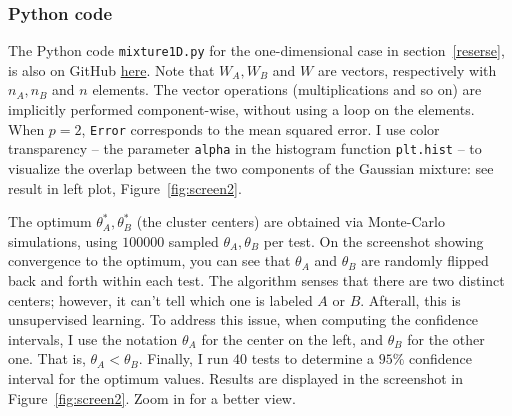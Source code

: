 \documentclass[oneside,10pt]{book}
\begin{document}
\subsubsection{Python code}\label{pyclustrw}

The Python code \texttt{mixture1D.py} for the one-dimensional case in section~\ref{reserse}, is also on GitHub \href{https://github.com/VincentGranville/Machine-Learning/blob/main/Source\%20Code/mixture1D.py}{here}. 
 Note that $W_A, W_B$ and $W$ are vectors, respectively with $n_A,n_B$ and $n$ elements. The vector operations (multiplications and so on) are  implicitly performed component-wise, without using a loop on the elements. When $p=2$, \texttt{Error} corresponds to the mean squared error. I use color transparency -- the parameter \texttt{alpha} in 
 the histogram function \texttt{plt.hist} -- to visualize the overlap between the two components of the Gaussian mixture: see result in left plot,
 Figure~\ref{fig:screen2}. 

The optimum $\theta_A^*,\theta_B^*$ (the cluster centers) are obtained via Monte-Carlo simulations, using
 $\num{100000}$ sampled $\theta_A,\theta_B$ per test. On the screenshot showing convergence to the optimum, you can see
 that $\theta_A$ and $\theta_B$ are randomly flipped back and forth within each test. The algorithm senses that there are two distinct centers; however, it can't tell which one is labeled $A$ or $B$.  Afterall, this is \textcolor{index}{unsupervised learning}. To address this issue, when computing the confidence intervals, I use the notation $\theta_A$ for the center on the left, and $\theta_B$ for the other one. That is, $\theta_A < \theta_B$. 
Finally, I run $40$ tests to determine a $95\%$ confidence interval for the 
 optimum values. Results are displayed in the screenshot in Figure~\ref{fig:screen2}. Zoom in for a better view.  \\ 
\end{document}
